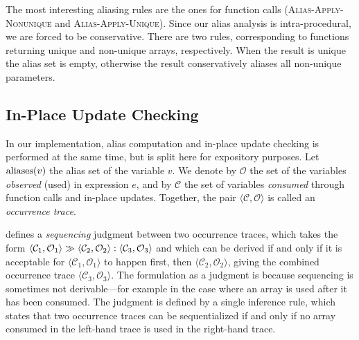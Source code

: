 The most interesting aliasing rules are the ones for function calls
(\textsc{Alias-Apply-Nonunique} and \textsc{Alias-Apply-Unique}).
Since our alias analysis is intra-procedural, we are forced to be
conservative.  There are two rules, corresponding to functions
returning unique and non-unique arrays, respectively. When the result
is unique the alias set is empty, otherwise the result conservatively
aliases all non-unique parameters.

\subsection{In-Place Update Checking}

\newcommand{\inPlaceSafe}[3]{#1\ \rhd \langle #2, #3 \rangle}
\newcommand{\consumedOK}[3]{#1 \vdash #2 \triangle #3}

In our implementation, alias computation and in-place update checking
is performed at the same time, but is split here for expository
purposes.  Let $\textrm{aliases}(v)$ the alias set of the variable $v$.  We
denote by $\mathcal{O}$ the set of the variables \textit{observed}
(used) in expression $e$, and by $\mathcal{C}$ the set of variables
\textit{consumed} through function calls and in-place updates.
Together, the pair $\langle\mathcal{C},\mathcal{O}\rangle$ is called
an \textit{occurrence trace}.

 defines a \textit{sequencing} judgment
between two occurrence traces, which takes the form $\langle\mathcal{C}_{1},\mathcal{O}_{1}\rangle \gg \langle\mathcal{C}_{2},\mathcal{O}_{2}\rangle : \langle\mathcal{C}_{3},\mathcal{O}_{3}\rangle$
and which can be derived if and only if it is acceptable for
$\langle\mathcal{C}_{1},\mathcal{O}_{1}\rangle$ to happen first, then
$\langle\mathcal{C}_{2},\mathcal{O}_{2}\rangle$, giving the combined
occurrence trace $\langle\mathcal{C}_{3},\mathcal{O}_3\rangle$.  The
formulation as a judgment is because sequencing is sometimes not
derivable---for example in the case where an array is used after  %
it has been consumed.  The judgment is defined by a single inference
rule, which states that two occurrence traces can be sequentialized if
and only if no array consumed in the left-hand trace is used in the
right-hand trace.


